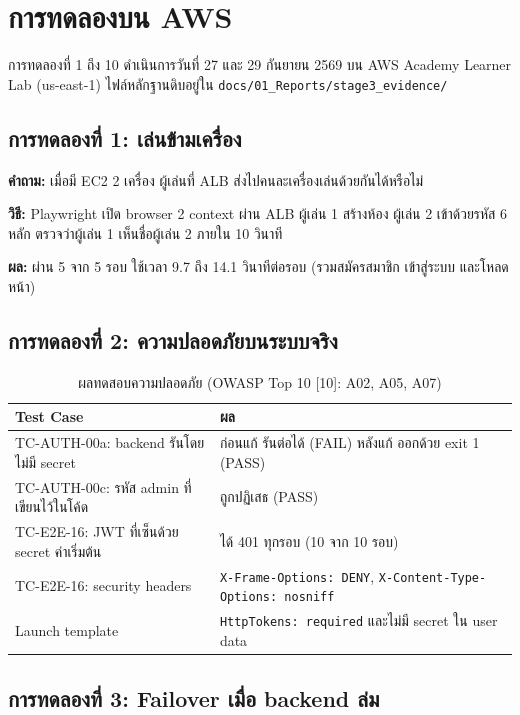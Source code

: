\section{การทดลองบน AWS}

การทดลองที่ 1 ถึง 10 ดำเนินการวันที่ 27 และ 29 กันยายน 2569 บน AWS Academy Learner Lab (us-east-1) ไฟล์หลักฐานดิบอยู่ใน \texttt{docs/01\_Reports/stage3\_evidence/}

\subsection{การทดลองที่ 1: เล่นข้ามเครื่อง}

\textbf{คำถาม:} เมื่อมี EC2 2 เครื่อง ผู้เล่นที่ ALB ส่งไปคนละเครื่องเล่นด้วยกันได้หรือไม่

\textbf{วิธี:} Playwright เปิด browser 2 context ผ่าน ALB ผู้เล่น 1 สร้างห้อง ผู้เล่น 2 เข้าด้วยรหัส 6 หลัก ตรวจว่าผู้เล่น 1 เห็นชื่อผู้เล่น 2 ภายใน 10 วินาที

\textbf{ผล:} ผ่าน 5 จาก 5 รอบ ใช้เวลา 9.7 ถึง 14.1 วินาทีต่อรอบ (รวมสมัครสมาชิก เข้าสู่ระบบ และโหลดหน้า) 

\subsection{การทดลองที่ 2: ความปลอดภัยบนระบบจริง}

\begin{table}[H]
\centering
\caption{ผลทดสอบความปลอดภัย (OWASP Top 10 [10]: A02, A05, A07)}
\begin{tabularx}{\textwidth}{lX}
\toprule
\textbf{Test Case} & \textbf{ผล} \\
\midrule
TC-AUTH-00a: backend รันโดยไม่มี secret & ก่อนแก้ รันต่อได้ (FAIL) หลังแก้ ออกด้วย exit 1 (PASS) \\
TC-AUTH-00c: รหัส admin ที่เขียนไว้ในโค้ด & ถูกปฏิเสธ (PASS) \\
TC-E2E-16: JWT ที่เซ็นด้วย secret ค่าเริ่มต้น & ได้ 401 ทุกรอบ (10 จาก 10 รอบ) \\
TC-E2E-16: security headers & \texttt{X-Frame-Options: DENY}, \texttt{X-Content-Type-Options: nosniff} \\
Launch template & \texttt{HttpTokens: required} และไม่มี secret ใน user data \\
\bottomrule
\end{tabularx}
\end{table}

\subsection{การทดลองที่ 3: Failover เมื่อ backend ล่ม}

